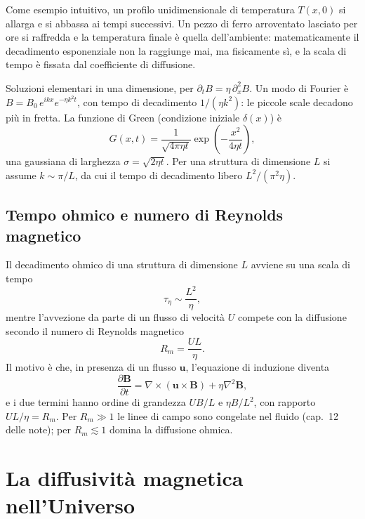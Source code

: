 Come esempio intuitivo, un profilo unidimensionale di temperatura $T(x,0)$ si allarga e si abbassa ai tempi successivi. Un pezzo di ferro arroventato lasciato per ore si raffredda e la temperatura finale è quella dell'ambiente: matematicamente il decadimento esponenziale non la raggiunge mai, ma fisicamente sì, e la scala di tempo è fissata dal coefficiente di diffusione.

Soluzioni elementari in una dimensione, per $\partial_tB=\eta\,\partial_x^2B$. Un modo di Fourier è $B=B_0\,e^{ikx}e^{-\eta k^2t}$, con tempo di decadimento $1/(\eta k^2)$: le piccole scale decadono più in fretta. La funzione di Green (condizione iniziale $\delta(x)$) è
\begin{equation}
G(x,t)=\frac{1}{\sqrt{4\pi\eta t}}\exp\left(-\frac{x^2}{4\eta t}\right),
\end{equation}
una gaussiana di larghezza $\sigma=\sqrt{2\eta t}$. Per una struttura di dimensione $L$ si assume $k\sim\pi/L$, da cui il tempo di decadimento libero $L^2/(\pi^2\eta)$.

\subsection{Tempo ohmico e numero di Reynolds magnetico}
Il decadimento ohmico di una struttura di dimensione $L$ avviene su una scala di tempo
\begin{equation}
\tau_\eta\sim\frac{L^2}{\eta},
\end{equation}
mentre l'avvezione da parte di un flusso di velocità $U$ compete con la diffusione secondo il numero di Reynolds magnetico
\begin{equation}
R_m=\frac{UL}{\eta}.
\end{equation}
Il motivo è che, in presenza di un flusso $\mathbf{u}$, l'equazione di induzione diventa
\begin{equation}
\frac{\partial\mathbf{B}}{\partial t}=\nabla\times(\mathbf{u}\times\mathbf{B})+\eta\nabla^2\mathbf{B},
\end{equation}
e i due termini hanno ordine di grandezza $UB/L$ e $\eta B/L^2$, con rapporto $UL/\eta=R_m$. Per $R_m\gg1$ le linee di campo sono congelate nel fluido (cap.~12 delle note); per $R_m\lesssim1$ domina la diffusione ohmica.

\section{La diffusività magnetica nell'Universo}


